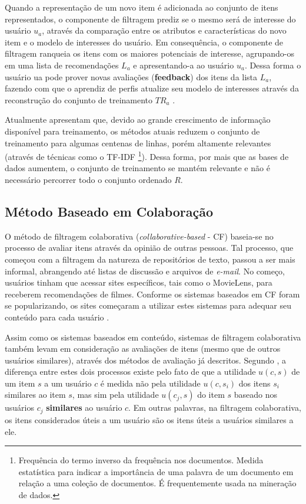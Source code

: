 \documentclass[12pt, openright, oneside, a4paper, brazil]{abntex2}
\begin{document}
Quando a representação de um novo item é adicionada ao conjunto de itens representados, o componente de filtragem prediz se o mesmo será de interesse do usuário $u_{a}$, através da comparação entre os atributos e características do novo item e o modelo de interesses do usuário. Em consequência, o componente de filtragem ranqueia os itens com os maiores potenciais de interesse, agrupando-os em uma lista de recomendações $L_{a}$ e apresentando-a ao usuário $u_{a}$. Dessa forma o usuário ua pode prover novas avaliações (\textbf{feedback}) dos itens da lista $L_{a}$, fazendo com que o aprendiz de perfis atualize seu modelo de interesses através da reconstrução do conjunto de treinamento $TR_{a}$ \cite{lops2011content}.

Atualmente  apresentam que, devido ao grande crescimento de informação disponível para treinamento, os métodos atuais reduzem o conjunto de treinamento para algumas centenas de linhas, porém altamente relevantes (através de técnicas como o TF-IDF \footnote{Frequência do termo inverso da frequência nos documentos. Medida estatística para indicar a importância de uma palavra de um documento em relação a uma coleção de documentos. É frequentemente usada na mineração de dados.}). Dessa forma, por mais que as bases de dados aumentem, o conjunto de treinamento se mantém relevante e não é necessário percorrer todo o conjunto ordenado $R$.

\subsection{Método Baseado em Colaboração} \label{recs:collaborative_based}

O método de filtragem colaborativa (\textit{collaborative-based} - CF) baseia-se no processo de avaliar itens através da opinião de outras pessoas. Tal processo, que começou com a filtragem da natureza de repositórios de texto, passou a ser mais informal, abrangendo até listas de discussão e arquivos de \textit{e-mail}. No começo, usuários tinham que acessar sites específicos, tais como o MovieLens, para receberem recomendações de filmes. Conforme os sistemas baseados em CF foram se popularizando, os sites começaram a utilizar estes sistemas para adequar seu conteúdo para cada usuário \cite{schafer2007collaborative}.

Assim como os sistemas baseados em conteúdo, sistemas de filtragem colaborativa também levam em consideração as avaliações de itens (mesmo que de outros usuários similares), através dos métodos de avaliação já descritos. Segundo , a diferença entre estes dois processos existe pelo fato de que a utilidade $u(c,s)$ de um item $s$ a um usuário $c$ é medida não pela utilidade $u(c,s_{i})$ dos itens $s_{i}$ similares ao item $s$, mas sim pela utilidade $u(c_{j}, s)$ do item $s$ baseado nos usuários $c_{j}$ \textbf{similares} ao usuário $c$. Em outras palavras, na filtragem colaborativa, os itens considerados úteis a um usuário são os itens úteis a usuários similares a ele.
\end{document}
